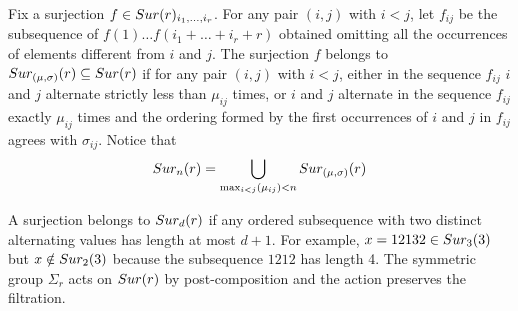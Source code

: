 \begin{definition}\label{surfiltration}
	Fix a surjection $f\in Sur(r)_{i_{1},\dots,i_{r}}$.
	For any pair $(i,j)$ with $i< j$, let $f_{ij}$ be the subsequence of $f(1) \dots f(i_1+\dots+i_r+r)$ obtained omitting all the occurrences of elements different from $i$ and $j$.
	The surjection $f$ belongs to $Sur_{(\mu,\sigma)}(r)\subseteq Sur(r)$ if for any pair $(i,j)$ with $i< j$, either in the sequence $f_{ij}$ $i$ and $j$ alternate strictly less than $\mu_{ij}$ times,
	or $i$ and $j$ alternate in the sequence $f_{ij}$  exactly $\mu_{ij}$ times and the ordering formed by the first occurrences of $i$ and $j$ in $f_{ij}$ agrees with $\sigma_{ij}$.
	Notice that
	\begin{equation*}
		Sur_{n}(r)=\bigcup_{\max_{i<j}(\mu_{ij})< n} Sur_{(\mu,\sigma)}(r)
	\end{equation*}
\end{definition}

A surjection belongs to $Sur_{d}(r)$ if any ordered subsequence with two distinct alternating values has length at most $d+1$.
For example, $x = 12132 \in Sur_3(3)$ but $x \notin Sur_2(3)$ because the subsequence $1212$ has length 4.
The symmetric group $\Sigma_r$ acts on $Sur(r)$ by post-composition and the action preserves the filtration.

